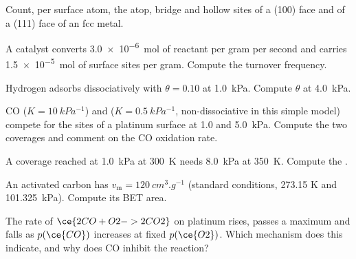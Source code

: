 \begin{exercise}[$\star$]\label{exo:b3:surfaces-catalysis:3}
Count, per surface atom, the atop, bridge and hollow sites of a (100) face and of
a (111) face of an fcc metal.
\end{exercise}

\begin{exercise}[$\star$]\label{exo:b3:surfaces-catalysis:4}
A catalyst converts \qty{3.0e-6}{mol} of reactant per gram per second and carries
\qty{1.5e-5}{mol} of surface sites per gram. Compute the turnover frequency.
\end{exercise}

\begin{exercise}[$\star\star$]\label{exo:b3:surfaces-catalysis:5}
Hydrogen adsorbs dissociatively with $\theta = 0.10$ at \qty{1.0}{kPa}. Compute $\theta$ at \qty{4.0}{kPa}.
\end{exercise}

\begin{exercise}[$\star\star$]\label{exo:b3:surfaces-catalysis:6}
CO ($K = \qty{10}{kPa^{-1}}$) and  ($K = \qty{0.5}{kPa^{-1}}$, non-dissociative in this simple model)
compete for the sites of a platinum surface at 1.0 and \qty{5.0}{kPa}. Compute the two
coverages and comment on the CO oxidation rate.
\end{exercise}

\begin{exercise}[$\star\star$]\label{exo:b3:surfaces-catalysis:7}
A coverage reached at \qty{1.0}{kPa} at \qty{300}{K} needs \qty{8.0}{kPa} at \qty{350}{K}. Compute the .
\end{exercise}

\begin{exercise}[$\star\star$]\label{exo:b3:surfaces-catalysis:8}
An activated carbon has $v_{\mathrm m} = \qty{120}{cm^3.g^{-1}}$ (standard conditions, 273.15 K and
\qty{101.325}{kPa}). Compute its BET area.
\end{exercise}

\begin{exercise}[$\star\star$]\label{exo:b3:surfaces-catalysis:9}
The rate of $\ce{2 CO + O2 -> 2 CO2}$ on platinum rises, passes a maximum and falls as $p(\ce{CO})$
increases at fixed $p(\ce{O2})$. Which mechanism does this indicate, and why does CO
inhibit the reaction?
\end{exercise}

